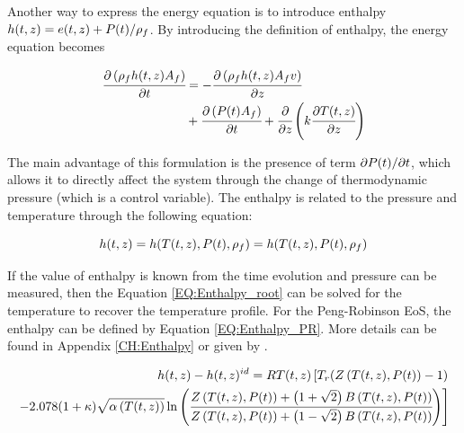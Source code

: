 \documentclass[../Article_Model_Parameters.tex]{subfiles}
\begin{document}
			Another way to express the energy equation is to introduce enthalpy ${\color{black}h}(t,z) = e(t,z) + {\color{black}P}(t) / \rho_f$. By introducing the definition of enthalpy, the energy equation becomes
			
			{\footnotesize
				\begin{align} \label{EQ:Enthalpy_equation}
					\cfrac{\partial \left(\rho_f {\color{black}h}(t,z) A_f\right)}{\partial t} &= - \cfrac{\partial \left( \rho_f {\color{black}h}(t,z) A_f v \right)}{\partial z}  \nonumber \\
					& + \cfrac{\partial \left({\color{black}P}(t) A_f\right)}{\partial t} + \cfrac{\partial}{\partial z} \left( k \cfrac{\partial T(t,z)}{\partial z} \right)
				\end{align}
			}
		
			The main advantage of this formulation is the presence of term $\partial {\color{black}P}(t) / \partial t $, which allows it to directly affect the system through the change of thermodynamic pressure (which is a control variable). The enthalpy is related to the pressure and temperature through the following equation:
			
			{\footnotesize
				\begin{equation}
					{\color{black}h}(t,z)={\color{black}h}(T(t,z),{\color{black}P}(t),\rho_f)={\color{black}h}( T(t,z),{\color{black}P}(t), \rho_f ) 
					\label{EQ:Enthalpy_root}
				\end{equation}
			}
		
			If the value of enthalpy is known from the time evolution and pressure can be measured, then the Equation \ref{EQ:Enthalpy_root} can be solved for the temperature to recover the temperature profile. For the Peng-Robinson EoS, the enthalpy can be defined by Equation \ref{EQ:Enthalpy_PR}. More details can be found in Appendix \ref{CH:Enthalpy} or given by \citet{Gmehling2019}.
			
			{\scriptsize
				\begin{equation}
					\begin{split}
					{\color{black}h}(t,z)-{\color{black}h}(t,z)^{id}={\color{black}R}T(t,z) \left[{\color{black}T_r}({\color{black}Z}\left(T(t,z), {\color{black}P}(t)\right)-1) \right. \\
					\left. -2.078(1+{\color{black}\kappa} ){\sqrt { {\color{black}\alpha}\left(T(t,z)\right) } } \ln \left(\cfrac{{\color{black}Z}\left(T(t,z), {\color{black}P}(t)\right)+\left( 1+\sqrt{2} \right){\color{black}B}\left(T(t,z), {\color{black}P}(t)\right)}{{\color{black}Z}\left(T(t,z), {\color{black}P}(t)\right)+\left( 1-\sqrt{2} \right){\color{black}B}\left(T(t,z), {\color{black}P}(t)\right)}\right)\right]
					\label{EQ:Enthalpy_PR}
				\end{split}
			\end{equation}				
			}
		
\end{document}
